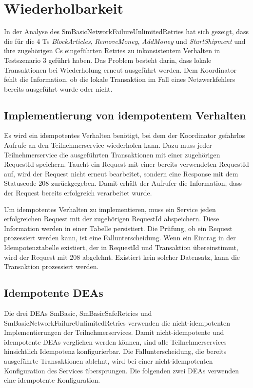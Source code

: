 \section{Wiederholbarkeit}

In der Analyse des SmBasicNetworkFailureUnlimitedRetries hat sich gezeigt, dass die für die 4 Ts \textit{BlockArticles}, \textit{RemoveMoney}, \textit{AddMoney} und \textit{StartShipment} und ihre zugehörigen Cs eingeführten Retries zu inkonsistentem Verhalten in Testszenario 3 geführt haben. Das Problem besteht darin, dass lokale Transaktionen bei Wiederholung erneut ausgeführt werden. Dem Koordinator fehlt die Information, ob die lokale Transaktion im Fall eines Netzwerkfehlers bereits ausgeführt wurde oder nicht. 

\subsection{Implementierung von idempotentem Verhalten} 
Es wird ein idempotentes Verhalten benötigt, bei dem der Koordinator gefahrlos Aufrufe an den Teilnehmerservice wiederholen kann. Dazu muss jeder Teilnehmerservice die ausgeführten Transaktionen mit einer zugehörigen RequestId speichern. Taucht ein Request mit einer bereits verwendeten RequestId auf, wird der Request nicht erneut bearbeitet, sondern eine Response mit dem Statuscode 208 zurückgegeben. Damit erhält der Aufrufer die Information, dass der Request bereits erfolgreich verarbeitet wurde. 

Um idempotentes Verhalten zu implementieren, muss ein Service jeden erfolgreichen Request mit der zugehörigen RequestId abspeichern. Diese Information werden in einer Tabelle persistiert. Die Prüfung, ob ein Request prozessiert werden kann, ist eine Fallunterscheidung. Wenn ein Eintrag in der Idempotenztabelle existiert, der in RequestId und Transaktion übereinstimmt, wird der Request mit 208 abgelehnt. Existiert kein solcher Datensatz, kann die Transaktion prozessiert werden.

\subsection{Idempotente DEAs}
Die drei DEAs SmBasic, SmBasicSafeRetries und SmBasicNetworkFailureUnlimitedRetries verwenden die nicht-idempotenten Implementierungen der Teilnehmerservices. Damit nicht-idempotente und idempotente DEAs verglichen werden können, sind alle Teilnehmerservices hinsichtlich Idempotenz konfigurierbar. Die Fallunterscheidung, die bereits ausgeführte Transaktionen ablehnt, wird bei einer nicht-idempotenten Konfiguration des Services übersprungen. Die folgenden zwei DEAs verwenden eine idempotente Konfiguration. 